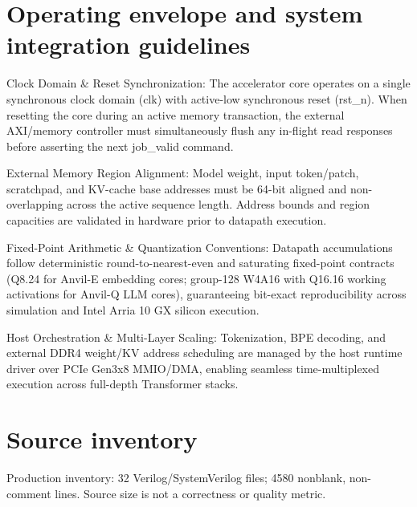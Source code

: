 \documentclass[11pt,a4paper]{article}
\begin{document}
\section{Operating envelope and system integration guidelines}

Clock Domain \& Reset Synchronization: The accelerator core operates on a single synchronous clock domain (\allowbreak{}clk)\allowbreak{} with active-low synchronous reset (\allowbreak{}rst\_\allowbreak{}n)\allowbreak{}. When resetting the core during an active memory transaction,\allowbreak{} the external AXI/\allowbreak{}memory controller must simultaneously flush any in-flight read responses before asserting the next job\_\allowbreak{}valid command.


External Memory Region Alignment: Model weight,\allowbreak{} input token/\allowbreak{}patch,\allowbreak{} scratchpad,\allowbreak{} and KV-cache base addresses must be 64-bit aligned and non-overlapping across the active sequence length. Address bounds and region capacities are validated in hardware prior to datapath execution.


Fixed-Point Arithmetic \& Quantization Conventions: Datapath accumulations follow deterministic round-to-nearest-even and saturating fixed-point contracts (\allowbreak{}Q8.24 for Anvil-E embedding cores; group-128 W4A16 with Q16.16 working activations for Anvil-Q LLM cores)\allowbreak{},\allowbreak{} guaranteeing bit-exact reproducibility across simulation and Intel Arria 10 GX silicon execution.


Host Orchestration \& Multi-Layer Scaling: Tokenization,\allowbreak{} BPE decoding,\allowbreak{} and external DDR4 weight/\allowbreak{}KV address scheduling are managed by the host runtime driver over PCIe Gen3x8 MMIO/\allowbreak{}DMA,\allowbreak{} enabling seamless time-multiplexed execution across full-depth Transformer stacks.


\appendix{}\section{Source inventory}

Production inventory: 32 Verilog/\allowbreak{}SystemVerilog files; 4580 nonblank,\allowbreak{} non-comment lines. Source size is not a correctness or quality metric.
\end{document}
